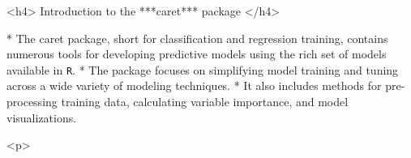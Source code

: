 

<h4> Introduction to the ***caret*** package </h4>


* The caret package, short for classification and regression training, contains numerous tools for developing predictive models using the rich set of models available in \texttt{R}.
* The package focuses on simplifying model training and tuning across a wide variety of modeling techniques.
* It also includes methods for pre-processing training data, calculating variable importance, and model visualizations.


<p>

